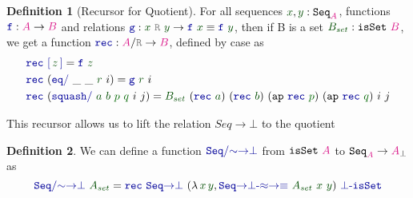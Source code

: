 \documentclass[twoside,11pt,openright]{report}
\theoremstyle{plain} %
\theoremstyle{definition}
\newtheorem{defn}{Definition}[section]
\theoremstyle{remark}
\newcommand*{\term}[1]{\textcolor{green!30!black}{#1}} %
\newcommand*{\pathterm}[1]{\textcolor{green!40!black}{#1}}
\newcommand*{\type}[1]{\textcolor{magenta!90!black}{#1}}
\newcommand*{\relation}[1]{\textcolor{gray}{\ensuremath{\mathtt{#1}}}}
\newcommand*{\function}[1]{\textcolor{blue!60!black}{\ensuremath{\mathtt{#1}}}}
\newcommand*{\typeformer}[1]{\ensuremath{\mathtt{#1}}}
\begin{document}
\begin{defn}[Recursor for Quotient]
  For all sequences \(\term{x}, \term{y} : \typeformer{Seq}_{\type{A}}\), functions \(\function{f} : \type{A} \rightarrow \type{B}\) and relations \(\function{g} : \term{x}~\relation{R}~\term{y} \rightarrow \function{f}~\term{x} \equiv \function{f}~\term{y}\), then if B is a set \(\term{B_{set}} : \typeformer{isSet}~\type{B}\), we get a function \(\function{rec} : \type{A} / \relation{R} \rightarrow \type{B}\), defined by case as
  \begin{equation}
    \begin{aligned}
      &\function{rec}~\function{[}\,\term{z}\,\function{]} = \function{f}~\term{z} \\
      &\function{rec}~(\function{eq/}~\_~\_~\term{r}~i) = \function{g}~\term{r}~i \\
      &\function{rec}~(\function{squash/}~\term{a}~\term{b}~\pathterm{p}~\pathterm{q}~i~j) = \term{B_{set}}~(\function{rec}~\term{a})~(\function{rec}~\term{b})~(\mathtt{ap}~\function{rec}~\pathterm{p})~(\mathtt{ap}~\function{rec}~\pathterm{q})~i~j
    \end{aligned}
  \end{equation}
\end{defn}
This recursor allows us to lift the relation \(Seq{\rightarrow}\bot\) to the quotient
\begin{defn}
  \label{eq:QuotientedSeqToPartialityMonad}
  We can define a function \(\function{Seq/{\sim}{\rightarrow}\bot}\) from \(\typeformer{isSet}~\type{A}\) to \(\typeformer{Seq}_{\type{A}} \rightarrow \type{A}_{\bot}\) as
  \begin{equation}
    \function{Seq/{\sim}{\rightarrow}\bot}~\term{A_{set}} = \function{rec}~\function{Seq{\rightarrow}\bot}~(\lambda\,\term{x}\,\term{y}, \function{Seq{\rightarrow}\bot\text{-}{\approx}{\rightarrow}{\equiv}}~\term{A_{set}}~\term{x}~\term{y})~\function{\bot\text{-}isSet}
  \end{equation} 
\end{defn}
\end{document}
